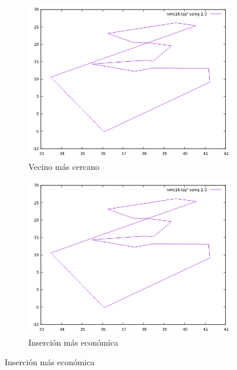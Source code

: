 \documentclass[12pt,spanish]{article}
\begin{document}
\begin{figure}[H]
\centering
\begin{subfigure}[b]{0.36\textwidth}
\includegraphics[width=\textwidth]{ulysses16_vmc.png}
\caption{Vecino más cercano}
\end{subfigure}
\quad
\begin{subfigure}[b]{0.36\textwidth}
\includegraphics[width=\textwidth]{ulysses16_vmc.png}
\caption{Inserción más económica}
\end{subfigure}

\vspace{1cm}


\end{figure}
\end{document}
